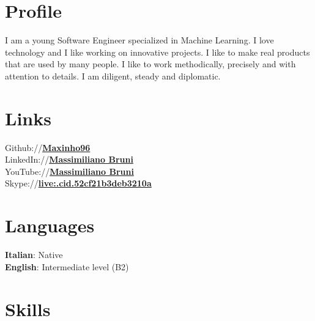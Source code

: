 \documentclass[]{deedy-resume-openfont}
\begin{document}
\begin{minipage}[t]{0.33\textwidth} 


\section{Profile}
I am a young Software Engineer specialized in Machine Learning. I love technology and I like working on innovative projects. I like to make real products that are used by many people. I like to work methodically, precisely and with attention to details. I am diligent, steady and diplomatic.


\section{Links} 
Github://\href{https://github.com/Maxinho96}{\bf Maxinho96} \\
LinkedIn://\href{https://www.linkedin.com/in/massimiliano-bruni-352926120}{\bf Massimiliano Bruni} \\
YouTube://\href{https://www.youtube.com/channel/UCqskrALDsaUvYC8ztJyqCug}{\bf Massimiliano Bruni} \\
Skype://\href{https://join.skype.com/invite/w9MIsgXZsji7}{\bf live:.cid.52cf21b3deb3210a}
\sectionsep


\section{Languages}
\textbf{Italian}: Native \\
\textbf{English}: Intermediate level (B2)
\sectionsep


\section{Skills}


\end{minipage}
\end{document}
